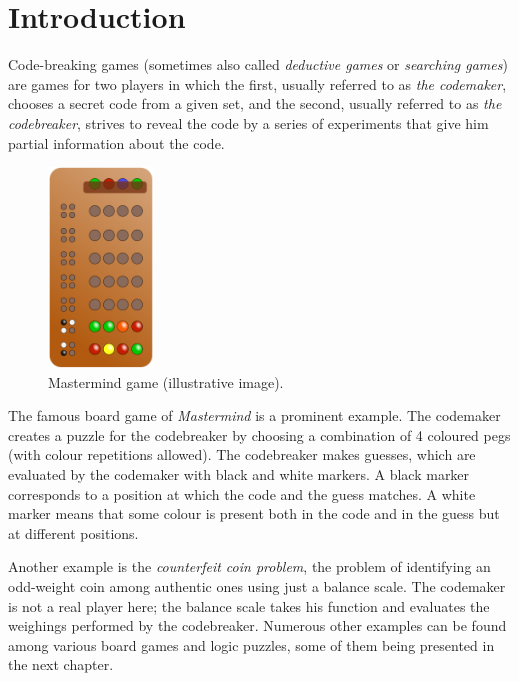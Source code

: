  \chapter{Introduction}


Code-breaking games (sometimes also called \emph{deductive games} or \emph{searching games})
  are games for two players in which the first,
  usually referred to as \emph{the codemaker},
    chooses a secret code from a given set, and the second,
  usually referred to as \emph{the codebreaker},
    strives to reveal the code by a series
    of experiments that give him partial information about the code.

\begin{figure}
  \vspace{-5mm}
  \begin{center}
  \includegraphics[width=0.25\textwidth]{pictures/mastermind.png}
  \vspace{-5mm}
  \end{center}
  \caption{Mastermind game (illustrative image)\protect\footnotemark.}
  \vspace{-5mm}
\end{figure}

The famous board game of \emph{Mastermind} is a prominent example.
The codemaker creates a puzzle for the codebreaker by choosing a
  combination of 4 coloured pegs (with colour repetitions allowed).
The codebreaker makes guesses, which are evaluated by the codemaker with
  black and white markers.
A black marker corresponds to a position at which the code and the guess matches.
A white marker means that some colour is present both in the code
  and in the guess but at different positions.

Another example is the \emph{counterfeit coin problem},
  the problem of identifying an odd-weight coin among
  authentic ones using just a balance scale.
The codemaker is not a real player here; the balance scale takes his function
  and evaluates the weighings performed by the codebreaker.
Numerous other examples can be found among various board games and logic puzzles,
 some of them being presented in the next chapter.

